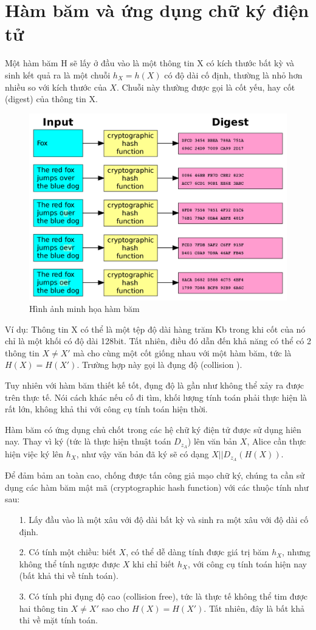 \documentclass[a4paper,12pt]{report}
\begin{document}
\section{Hàm băm và ứng dụng chữ ký điện tử}
Một hàm băm  H sẽ lấy ở đầu vào là một thông tin X có kích thước bất kỳ và sinh kết quả ra là một chuỗi $h_X=h(X)$ có độ dài cố định, thường là nhỏ hơn nhiều so với kích thước của $X$. Chuỗi này thường được gọi là cốt yếu, hay cốt (digest) của thông tin X.
\begin{center}
\begin{figure}[H]
\centering
\includegraphics[width=0.65\linewidth]{../hash.png}
\caption{Hình ảnh minh họa hàm băm}
\end{figure}
\end{center}

Ví dụ: Thông tin X có thể là một tệp độ dài hàng trăm Kb trong khi cốt của nó chỉ là một khối có độ dài 128bit. Tất nhiên, điều đó dẫn đến khả năng có thể có 2 thông tin $X \neq X'$ mà cho cùng một cốt giống nhau với một hàm băm, tức là $H(X) = H(X')$. Trường hợp này gọi là đụng độ (collision ).

Tuy nhiên với hàm băm thiết kế tốt, đụng độ là gần như không thể xảy ra được trên thực tế. Nói cách khác nếu cố đi tìm, khối lượng tính toán phải thực hiện là rất lớn, không khả thi với công cụ tính toán hiện thời.

Hàm băm có ứng dụng chủ chốt trong các hệ chữ ký điện tử được sử dụng hiên nay. Thay vì ký (tức là thực hiện thuật toán $D_{z_A}$) lên văn bản $X$, Alice cần thực hiện việc ký lên $h_X$, như vậy văn bản đã ký sẽ có dạng $X || D_{z_A}(H(X))$.

Để đảm bảm an toàn cao, chống được tấn công giả mạo chữ ký, chúng ta cần sử dụng các hàm băm mật mã (cryptographic hash function) với các thuộc tính như sau:
\begin{itemize}
\item[1. ] Lấy đầu vào là một xâu với độ dài bất kỳ và sinh ra một xâu với độ dài cố định.
\item[2. ] Có tính một chiều: biết $X$, có thể dễ dàng tính được giá trị băm $h_X$, nhưng không thể tính ngược được $X$ khi chỉ biết $h_X$, với công cụ tính toán hiện nay (bất khả thi về tính toán).
\item[3. ] Có tính phi đụng độ cao (collision free), tức là thực tế không thể tim được hai thông tin $X \neq X'$ sao cho $H(X) = H(X')$. Tất nhiên, đây là bất khả thi về mặt tính toán.
\end{itemize}
\end{document}
